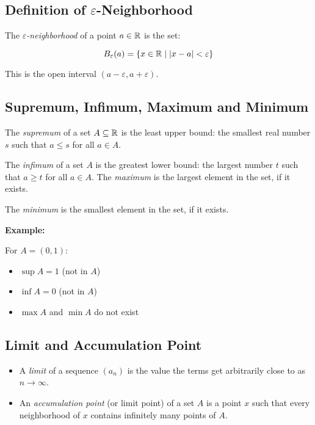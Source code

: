 \subsection{Definition of \texorpdfstring{\(\varepsilon\)}{ε}-Neighborhood}

The \emph{\(\varepsilon\)-neighborhood} of a point \(a \in \mathbb{R}\) is the set:

\[
    B_\varepsilon(a) = \{x \in \mathbb{R} \mid |x - a| < \varepsilon\}
\]

This is the open interval \((a - \varepsilon, a + \varepsilon)\).

\subsection{Supremum, Infimum, Maximum and Minimum}

The \emph{supremum} of a set \(A \subseteq \mathbb{R}\) is the 
least upper bound: the smallest real number \(s\) such that \(a \le s\) for all \(a \in A\).

The \emph{infimum} of a set \(A\) is the greatest lower bound: 
the largest number \(t\) such that \(a \ge t\) for all \(a \in A\). The \emph{maximum} is the largest 
element in the set, if it exists.

The \emph{minimum} is the smallest element in the set, if it exists.
\vspace{\baselineskip}

\textbf{Example:}
\vspace{\baselineskip}

For \(A = (0,1)\):

\begin{itemize}

    \item \(\sup A = 1\) (not in \(A\))

    \item \(\inf A = 0\) (not in \(A\))

    \item \(\max A\) and \(\min A\) do not exist

\end{itemize}

\subsection{Limit and Accumulation Point}

\begin{itemize}

    \item A \emph{limit} of a sequence \((a_n)\) is the value the terms get arbitrarily close to as 
    \(n \to \infty\).

    \item An \emph{accumulation point} (or limit point) of a set \(A\) is a point \(x\) such that every 
    neighborhood of \(x\) contains infinitely many points of \(A\).

\end{itemize}


